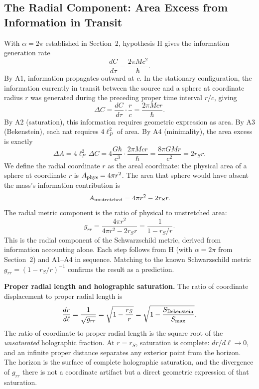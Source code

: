 \documentclass[12pt]{article}
\begin{document}
\subsection{The Radial Component: Area Excess from Information
in Transit}
\label{sec:grr}

With $\alpha = 2\pi$ established in Section~2, hypothesis H gives the
information generation rate
\begin{equation}
  \frac{dC}{d\tau} = \frac{2\pi Mc^2}{\hbar}.
  \label{eq:gen-rate}
\end{equation}
By A1, information propagates outward at $c$.
In the stationary configuration, the information currently in transit
between the source and a sphere at coordinate radius $r$ was generated
during the preceding proper time interval $r/c$, giving
\begin{equation}
  \Delta C = \frac{dC}{d\tau}\cdot\frac{r}{c}
           = \frac{2\pi Mcr}{\hbar}.
  \label{eq:transit}
\end{equation}
By A2 (saturation), this information requires geometric expression as
area.
By A3 (Bekenstein), each nat requires $4\ell_P^2$ of area.
By A4 (minimality), the area excess is exactly
\begin{equation}
  \Delta A = 4\ell_P^2\,\Delta C
           = 4\frac{G\hbar}{c^3}\cdot\frac{2\pi Mcr}{\hbar}
           = \frac{8\pi GMr}{c^2}
           = 2 r_S r.
  \label{eq:deltaA}
\end{equation}
We define the radial coordinate $r$ as the areal coordinate: the
physical area of a sphere at coordinate $r$ is $A_{\rm phys} = 4\pi r^2$.
The area that sphere would have absent the mass's information
contribution is
\begin{equation}
  A_{\rm unstretched} = 4\pi r^2 - 2 r_S r.
  \label{eq:unstretched}
\end{equation}
The radial metric component is the ratio of physical to unstretched
area:
\begin{equation}
  g_{rr} = \frac{4\pi r^2}{4\pi r^2 - 2 r_S r}
          = \frac{1}{1 - r_S/r}.
  \label{eq:grr}
\end{equation}
This is the radial component of the Schwarzschild metric, derived from
information accounting alone.
Each step follows from H (with $\alpha = 2\pi$ from Section~2) and
A1--A4 in sequence.
Matching to the known Schwarzschild metric $g_{rr} = (1 - r_S/r)^{-1}$
confirms the result as a prediction.

\medskip
\noindent\textbf{Proper radial length and holographic saturation.}
The ratio of coordinate displacement to proper radial length is
\begin{equation*}
  \frac{dr}{d\ell}
  = \frac{1}{\sqrt{g_{rr}}}
  = \sqrt{1 - \frac{r_S}{r}}
  = \sqrt{1 - \frac{S_{\rm Bekenstein}}{S_{\max}}}.
\end{equation*}
The ratio of coordinate to proper radial length is the square root
of the \emph{unsaturated} holographic fraction.
At $r = r_S$, saturation is complete: $dr/d\ell \to 0$, and an
infinite proper distance separates any exterior point from the horizon.
The horizon is the surface of complete holographic saturation, and the
divergence of $g_{rr}$ there is not a coordinate artifact but a direct
geometric expression of that saturation.
\end{document}

